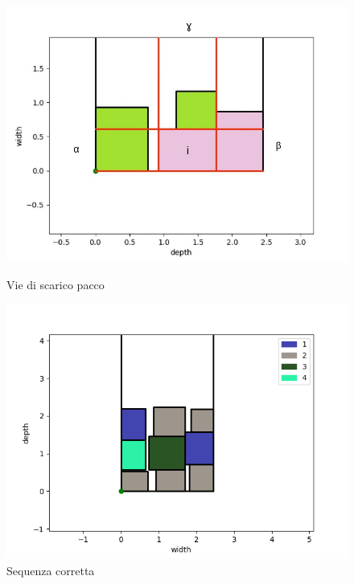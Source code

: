 \begin{figure}[H]
	\centering
	\begin{minipage}{.5\textwidth}
		\centering
		\includegraphics[width=1.\linewidth]{figures/abg_2drs}
		\caption[Vie scaricamento pacco]{Vie di scarico pacco}  
		\label{fig:abg_2drs}
	\end{minipage}%
	\begin{minipage}{.5\textwidth}
		\centering
		\includegraphics[width=1.\linewidth]{figures/2drs}
		\caption[Corretta sequenza di scarico]{Sequenza corretta}  
		\label{fig:2drs_abg}
	\end{minipage}
\end{figure}

